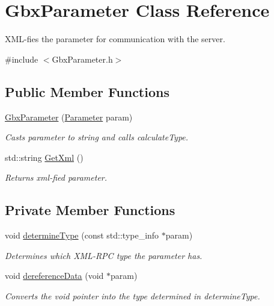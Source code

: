\hypertarget{classGbxParameter}{\section{Gbx\-Parameter Class Reference}
\label{classGbxParameter}
}


X\-M\-L-\/fies the parameter for communication with the server.  




{\ttfamily \#include $<$Gbx\-Parameter.\-h$>$}

\subsection*{Public Member Functions}
\begin{DoxyCompactItemize}
\item 
\hyperlink{classGbxParameter_a3a341208c5af115d80553213b156dbdd}{Gbx\-Parameter} (\hyperlink{structParameter}{Parameter} param)
\begin{DoxyCompactList}\small\item\em Casts parameter to string and calls calculate\-Type. \end{DoxyCompactList}\item 
\hypertarget{classGbxParameter_a3c6800bca78c5bb4ed7de62cf552ee35}{std\-::string \hyperlink{classGbxParameter_a3c6800bca78c5bb4ed7de62cf552ee35}{Get\-Xml} ()}\label{classGbxParameter_a3c6800bca78c5bb4ed7de62cf552ee35}

\begin{DoxyCompactList}\small\item\em Returns xml-\/fied parameter. \end{DoxyCompactList}\end{DoxyCompactItemize}
\subsection*{Private Member Functions}
\begin{DoxyCompactItemize}
\item 
void \hyperlink{classGbxParameter_af708857623b85684ede2ae002e53a118}{determine\-Type} (const std\-::type\-\_\-info $\ast$param)
\begin{DoxyCompactList}\small\item\em Determines which X\-M\-L-\/\-R\-P\-C type the parameter has. \end{DoxyCompactList}\item 
void \hyperlink{classGbxParameter_a8e038bca99e1eb7339567fe1af79586c}{dereference\-Data} (void $\ast$param)
\begin{DoxyCompactList}\small\item\em Converts the void pointer into the type determined in determine\-Type. \end{DoxyCompactList}\end{DoxyCompactItemize}
